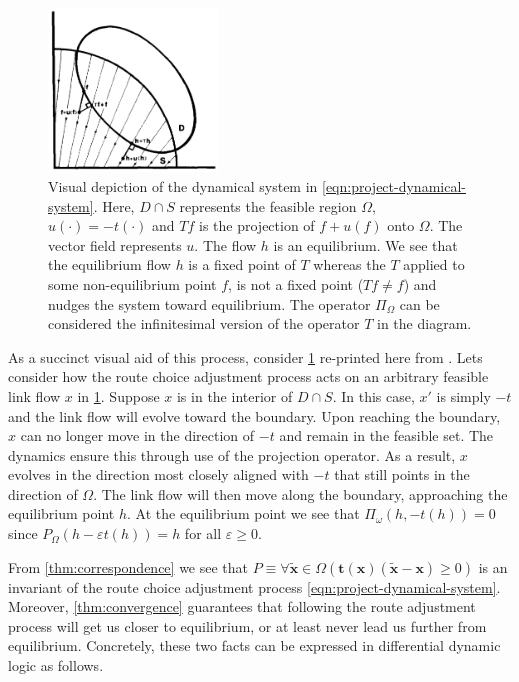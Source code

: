 \begin{figure}[!ht]
    \centering
    \includegraphics[width=0.4\textwidth]{figures/equilibrium-projection.png}
    \caption{Visual depiction of the dynamical system in \eqref{eqn:project-dynamical-system}. Here, $D\cap S$ represents the feasible region $\Omega$, $u(\cdot) = -t(\cdot)$ and $Tf$ is the projection of $f+u(f)$ onto $\Omega$. The vector field represents $u$. The flow $h$ is an equilibrium. We see that the equilibrium flow $h$ is a fixed point of $T$ whereas the $T$ applied to some non-equilibrium point $f$, is not a fixed point ($Tf \neq f$) and nudges the system toward equilibrium. The operator $\Pi_{\Omega}$ can be considered the infinitesimal version of the operator $T$ in the diagram.}
    \label{fig:equilibrium-projection}
\end{figure}

As a succinct visual aid of this process, consider \cref{fig:equilibrium-projection} re-printed here from  \citet{smith1979existence}. 
Lets consider how the route choice adjustment process acts on an arbitrary feasible link flow $x$ in \cref{fig:equilibrium-projection}.
Suppose $x$ is in the interior of $D\cap S$.
In this case, $x'$ is simply $-t$ and the link flow will evolve toward the boundary.
Upon reaching the boundary, $x$ can no longer move in the direction of $-t$ and remain in the feasible set.
The dynamics ensure this through use of the projection operator.
As a result, $x$ evolves in the direction most closely aligned with $-t$ that still points in the direction of $\Omega$.
The link flow will then move along the boundary, approaching the equilibrium point $h$.  
At the equilibrium point we see that $\Pi_{\omega}(h, -t(h))=0$ since $P_{\Omega}(h- \varepsilon t(h)) = h$ for all $\varepsilon \geq 0$.

From \cref{thm:correspondence} we see that $P \equiv \forall \mathbf{\tilde{x}} \in \Omega (\mathbf{t}(\mathbf{x})(\mathbf{\tilde{x}}- \mathbf{x}) \geq 0)$ is an invariant of the route choice adjustment process \eqref{eqn:project-dynamical-system}.
Moreover, \cref{thm:convergence} guarantees that following the route adjustment process will get us closer to equilibrium, or at least never lead us further from equilibrium.
Concretely, these two facts can be expressed in differential dynamic logic as follows.

